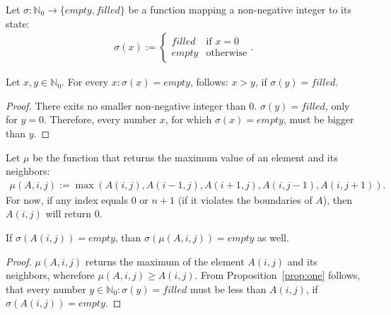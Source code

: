 \documentclass[twoside,11pt]{article}
\begin{document}
Let $\sigma : \mathbb{N}_0 \rightarrow \{empty,filled\}$ be
a function mapping a non-negative integer to its state:
\begin{align*}
  \sigma(x) := \begin{cases}
    filled &\text{if } x = 0 \\
    empty  &\text{otherwise}
  \end{cases}.
\end{align*}

\begin{proposition}
  \label{prop:one}
  Let $x, y \in \mathbb{N}_0$.
  For every $x: \sigma(x) = empty$, follows: $x > y$, if
  $\sigma(y) = filled$.
\end{proposition}

\begin{proof}
  There exits no smaller non-negative integer than $0$.
  $\sigma(y) = filled$, only for $y = 0$. Therefore, every
  number $x$, for which $\sigma(x) = empty$, must be bigger
  than $y$.
\end{proof}

Let $\mu$ be the function that returns the maximum value
of an element and its neighbors:
\begin{align*}
  \mu(A, i, j) := \max(A(i,j), A(i-1,j), A(i+1,j),
                       A(i,j-1), A(i,j+1)).
\end{align*}
For now, if any index equals $0$ or $n + 1$ (if it violates
the boundaries of $A$), then $A(i, j)$ will return $0$.

\begin{proposition}
  \label{prop:two}
  If $\sigma(A(i, j)) = empty$, than
  $\sigma(\mu(A, i, j)) = empty$ as well.
\end{proposition}

\begin{proof}
  $\mu(A, i, j)$ returns the maximum of the element
  $A(i, j)$ and its neighbors, wherefore $\mu(A, i, j) \geq
  A(i, j)$.
  From Proposition~\ref{prop:one} follows, that every
  number $y \in \mathbb{N}_0: \sigma(y) = filled$ must be
  less than $A(i, j)$, if $\sigma(A(i,j)) = empty$.
\end{proof}
\end{document}
